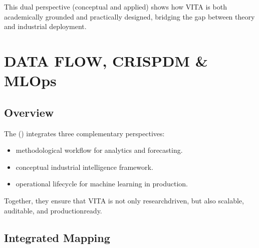\documentclass[letterpaper,10pt,english]{sphinxmanual}
\begin{document}
\sphinxAtStartPar
This dual perspective (conceptual and applied) shows how VITA is both academically grounded
and practically designed, bridging the gap between theory and industrial deployment.

\sphinxstepscope


\section{DATA FLOW, CRISP\sphinxhyphen{}DM \& MLOps}
\label{\detokenize{dataflow:data-flow-crisp-dm-mlops}}\label{\detokenize{dataflow::doc}}

\subsection{Overview}
\label{\detokenize{dataflow:overview}}
\sphinxAtStartPar
The  () integrates
three complementary perspectives:
\begin{itemize}
\item {} 
\sphinxAtStartPar
{} \textendash{} methodological workflow for analytics and forecasting.

\item {} 
\sphinxAtStartPar
{} \textendash{} conceptual industrial intelligence framework.

\item {} 
\sphinxAtStartPar
{} \textendash{} operational lifecycle for machine learning in production.

\end{itemize}

\sphinxAtStartPar
Together, they ensure that VITA is not only research\sphinxhyphen{}driven, but also scalable,
auditable, and production\sphinxhyphen{}ready.


\subsection{Integrated Mapping}
\label{\detokenize{dataflow:integrated-mapping}}
\end{document}
